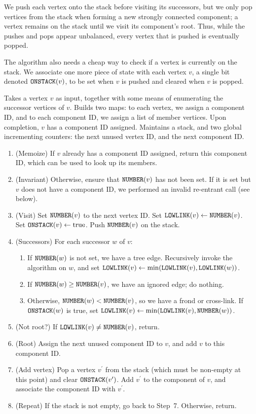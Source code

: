 \documentclass[../generics]{subfiles}
\begin{document}
We push each vertex onto the stack before visiting its successors, but we only pop vertices from the stack when forming a new strongly connected component; a vertex remains on the stack until we visit its component's root. Thus, while the pushes and pops appear unbalanced, every vertex that is pushed is eventually popped.

The algorithm also needs a cheap way to check if a vertex is currently on the stack. We associate one more piece of state with each vertex $v$, a single bit denoted $\texttt{ONSTACK}(v)$, to be set when $v$ is pushed and cleared when $v$ is popped.

\begin{algorithm}\label{tarjan}
Takes a vertex $v$ as input, together with some means of enumerating the successor vertices of $v$. Builds two maps: to each vertex, we assign a component ID, and to each component ID, we assign a list of member vertices. Upon completion, $v$ has a component ID assigned. Maintains a stack, and two global incrementing counters: the next unused vertex ID, and the next component ID.
\begin{enumerate}
\item (Memoize) If $v$ already has a component ID assigned, return this component ID, which can be used to look up its members.
\item (Invariant) Otherwise, ensure that $\texttt{NUMBER}(v)$ has not been set. If it is set but $v$ does not have a component ID, we performed an invalid re-entrant call (see below).
\item (Visit) Set $\texttt{NUMBER}(v)$ to the next vertex ID. Set $\texttt{LOWLINK}(v)\leftarrow\texttt{NUMBER}(v)$. Set $\texttt{ONSTACK}(v)\leftarrow \textrm{true}$. Push $\texttt{NUMBER}(v)$ on the stack.
\item (Successors) For each successor $w$ of $v$:
\begin{enumerate}
\item If $\texttt{NUMBER}(w)$ is not set, we have a tree edge. Recursively invoke the algorithm on $w$, and set $\texttt{LOWLINK}(v)\leftarrow\min(\texttt{LOWLINK}(v), \texttt{LOWLINK}(w))$.
\item If $\texttt{NUMBER}(w)\geq\texttt{NUMBER}(v)$, we have an ignored edge; do nothing.
\item Otherwise, $\texttt{NUMBER}(w)<\texttt{NUMBER}(v)$, so we have a frond or cross-link. If $\texttt{ONSTACK}(w)$ is true, set $\texttt{LOWLINK}(v)\leftarrow\min(\texttt{LOWLINK}(v),\texttt{NUMBER}(w))$.
\end{enumerate}
\item (Not root?) If $\texttt{LOWLINK}(v)\neq\texttt{NUMBER}(v)$, return.
\item (Root) Assign the next unused component ID to $v$, and add $v$ to this component ID.
\item (Add vertex) Pop a vertex $v^\prime$ from the stack (which must be non-empty at this point) and clear $\texttt{ONSTACK}(v^\prime)$. Add $v^\prime$ to the component of $v$, and associate the component ID with $v^\prime$.
\item (Repeat) If the stack is not empty, go back to Step~7. Otherwise, return.
\end{enumerate}
\end{algorithm}
\end{document}
